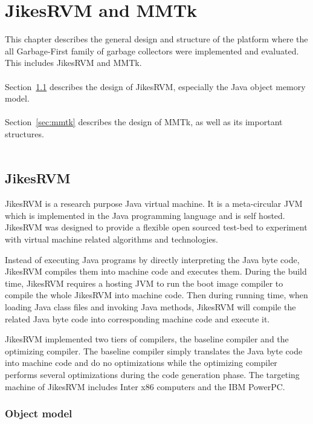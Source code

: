 \chapter{JikesRVM and MMTk}
\label{cha:platform}

This chapter describes the general design and structure of the platform where the all Garbage-First
family of garbage collectors were implemented and evaluated. This includes JikesRVM
and MMTk.
\\\\
Section~\ref{sec:jikesrvm} describes the design of JikesRVM, especially the Java object memory model.
\\\\
Section~\ref{sec:mmtk} describes the design of MMTk, as well as its important structures.
\\\\

\section{JikesRVM}
\label{sec:jikesrvm}

JikesRVM is a research purpose Java virtual machine. It is a meta-circular JVM
which is implemented in the Java programming language and is self hosted.
JikesRVM was designed to provide a flexible open sourced test-bed to
experiment with virtual machine related algorithms and technologies.

Instead of executing Java programs by directly interpreting the Java byte code,
JikesRVM compiles them into machine code and executes them.
During the build time, JikesRVM requires a hosting JVM to run the boot image compiler
to compile the whole JikesRVM into machine code.
Then during running time, when loading Java class files and invoking Java methods,
JikesRVM will compile the related Java byte code into corresponding machine code and execute it.

JikesRVM implemented two tiers of compilers, the baseline compiler and the optimizing compiler.
The baseline compiler simply translates the Java byte code into machine code and do no
optimizations while the optimizing compiler performs several optimizations during the
code generation phase. The targeting machine of JikesRVM includes Inter x86 computers
and the IBM PowerPC.

\subsection{Object model}

